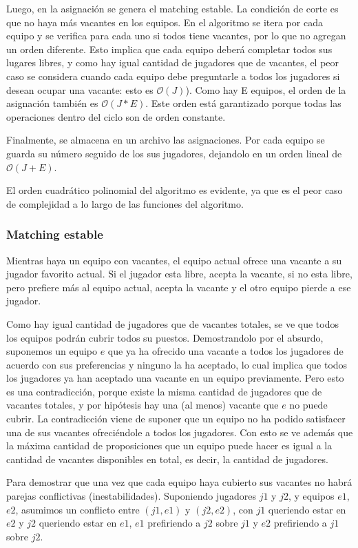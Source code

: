 \documentclass[article,a4paper]{article}
\newcommand{\bigO}{\mathcal{O}}
\begin{document}
Luego, en la asignación se genera el matching estable. La condición de corte es que no haya más vacantes en los equipos. En el algoritmo se itera por cada equipo y se verifica para cada uno si todos tiene vacantes, por lo que no agregan un orden diferente. Esto implica que cada equipo deberá completar todos sus lugares libres, y como hay igual cantidad de jugadores que de vacantes, el peor caso se considera cuando cada equipo debe preguntarle a todos los jugadores si desean ocupar una vacante: esto es $\bigO(J)$). Como hay E equipos, el orden de la asignación también es $\bigO(J*E)$. Este orden está garantizado porque todas las operaciones dentro del ciclo son de orden constante.



Finalmente, se almacena en un archivo las asignaciones. Por cada equipo se guarda su número seguido de los sus jugadores, dejandolo en un orden lineal de $\bigO(J+E)$.

El orden cuadrático polinomial del algoritmo es evidente, ya que es el peor caso de complejidad a lo largo de las funciones del algoritmo.

\subsubsection{Matching estable}

Mientras haya un equipo con vacantes, el equipo actual ofrece una vacante a su jugador favorito actual. Si el jugador esta libre, acepta la vacante, si no esta libre, pero prefiere más al equipo actual, acepta la vacante y el otro equipo pierde a ese jugador.

Como hay igual cantidad de jugadores que de vacantes totales, se ve que todos los equipos podrán cubrir todos su puestos. Demostrandolo por el absurdo, suponemos un equipo $e$ que ya ha ofrecido una vacante a todos los jugadores de acuerdo con sus preferencias y ninguno la ha aceptado, lo cual implica que todos los jugadores ya han aceptado una vacante en un equipo previamente. Pero esto es una contradicción, porque existe la misma cantidad de jugadores que de vacantes totales, y por hipótesis hay una (al menos) vacante que $e$ no puede cubrir. La contradicción viene de suponer que un equipo no ha podido satisfacer una de sus vacantes ofreciéndole a todos los jugadores. Con esto se ve además que la máxima cantidad de proposiciones que un equipo puede hacer es igual a la cantidad de vacantes disponibles en total, es decir, la cantidad de jugadores.

Para demostrar que una vez que cada equipo haya cubierto sus vacantes no habrá parejas conflictivas (inestabilidades). Suponiendo jugadores $j1$ y $j2$, y equipos $e1$, $e2$, asumimos un conflicto entre $(j1,e1)$ y $(j2,e2)$, con $j1$ queriendo estar en $e2$ y $j2$ queriendo estar en $e1$, $e1$ prefiriendo a $j2$ sobre $j1$ y $e2$ prefiriendo a $j1$ sobre $j2$.
\end{document}
